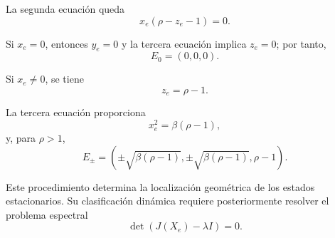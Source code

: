 \documentclass[12pt,a4paper,oneside]{report}
\numberwithin{equation}{chapter}
\begin{document}
La segunda ecuación queda
\begin{equation}
    x_e(\rho-z_e-1)=0.
\end{equation}

Si \(x_e=0\), entonces \(y_e=0\) y la tercera ecuación implica \(z_e=0\); por tanto,
\begin{equation}
    E_0=(0,0,0).
\end{equation}

Si \(x_e\neq0\), se tiene
\begin{equation}
    z_e=\rho-1.
\end{equation}

La tercera ecuación proporciona
\begin{equation}
    x_e^2=\beta(\rho-1),
\end{equation}
y, para \(\rho>1\),
\begin{equation}
    E_\pm= \left( \pm\sqrt{\beta(\rho-1)}, \pm\sqrt{\beta(\rho-1)}, \rho-1 \right).
\end{equation}

Este procedimiento determina la localización geométrica de los estados estacionarios. Su clasificación dinámica requiere posteriormente resolver el problema espectral
\[
    \det\!\left(J(X_e)-\lambda I\right)=0.
\]
\end{document}

